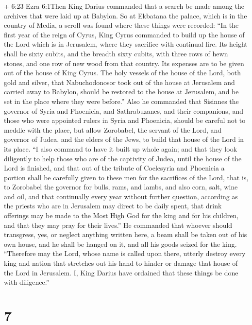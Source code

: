  + 6:23 Ezra 6:1Then King Darius commanded that a search be
made among the archives that were laid up at Babylon. So at Ekbatana the
palace, which is in the country of Media, a scroll was found where these
things were recorded:  ``In the first year of the reign of
Cyrus, King Cyrus commanded to build up the house of the Lord which is
in Jerusalem, where they sacrifice with continual fire. 
Its height shall be sixty cubits, and the breadth sixty cubits, with
three rows of hewn stones, and one row of new wood from that country.
Its expenses are to be given out of the house of King Cyrus.
 The holy vessels of the house of the Lord, both gold and
silver, that Nabuchodonosor took out of the house at Jerusalem and
carried away to Babylon, should be restored to the house at Jerusalem,
and be set in the place where they were before.''  Also he
commanded that Sisinnes the governor of Syria and Phoenicia, and
Sathrabuzanes, and their companions, and those who were appointed rulers
in Syria and Phoenicia, should be careful not to meddle with the place,
but allow Zorobabel, the servant of the Lord, and governor of Judea, and
the elders of the Jews, to build that house of the Lord in its place.
 ``I also command to have it built up whole again; and that
they look diligently to help those who are of the captivity of Judea,
until the house of the Lord is finished,  and that out of
the tribute of Coelesyria and Phoenicia a portion shall be carefully
given to these men for the sacrifices of the Lord, that is, to Zorobabel
the governor for bulls, rams, and lambs,  and also corn,
salt, wine and oil, and that continually every year without further
question, according as the priests who are in Jerusalem may direct to be
daily spent,  that drink offerings may be made to the Most
High God for the king and for his children, and that they may pray for
their lives.''  He commanded that whoever should
transgress, yes, or neglect anything written here, a beam shall be taken
out of his own house, and he shall be hanged on it, and all his goods
seized for the king.  ``Therefore may the Lord, whose name
is called upon there, utterly destroy every king and nation that
stretches out his hand to hinder or damage that house of the Lord in
Jerusalem.  I, King Darius have ordained that these things
be done with diligence.''

\hypertarget{section-6}{%
\section{7}\label{section-6}}

